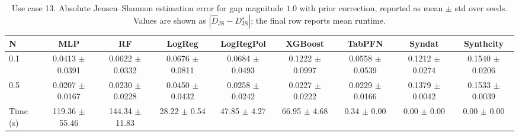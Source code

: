 \begin{table}[ht]
\centering
\scriptsize
\setlength{\tabcolsep}{2.5pt}
\caption{Use case 13. Absolute Jensen--Shannon estimation error for gap magnitude $1.0$ with prior correction, reported as mean $\pm$ std over seeds. Values are shown as $|\widehat{D}_{\mathrm{JS}} - D_{\mathrm{JS}}^{\star}|$; the final row reports mean runtime.}
\label{tab:uc13_gap_1p0_on_mean_std_from_seeds}
\begin{tabular}{lcccccccc}
\toprule
N & MLP & RF & LogReg & LogRegPol & XGBoost & TabPFN & Syndat & Synthcity \\
\midrule
0.1 & 0.0413 $\pm$ 0.0391 & 0.0622 $\pm$ 0.0332 & 0.0676 $\pm$ 0.0811 & 0.0684 $\pm$ 0.0493 & 0.1222 $\pm$ 0.0997 & 0.0558 $\pm$ 0.0539 & 0.1212 $\pm$ 0.0274 & 0.1540 $\pm$ 0.0206 \\
0.5 & 0.0207 $\pm$ 0.0167 & 0.0230 $\pm$ 0.0228 & 0.0450 $\pm$ 0.0432 & 0.0258 $\pm$ 0.0242 & 0.0227 $\pm$ 0.0222 & 0.0229 $\pm$ 0.0166 & 0.1379 $\pm$ 0.0042 & 0.1533 $\pm$ 0.0039 \\
Time (s) & 119.36 $\pm$ 55.46 & 144.34 $\pm$ 11.83 & 28.22 $\pm$ 0.54 & 47.85 $\pm$ 4.27 & 66.95 $\pm$ 4.68 & 0.34 $\pm$ 0.00 & 0.00 $\pm$ 0.00 & 0.00 $\pm$ 0.00 \\
\bottomrule
\end{tabular}
\end{table}